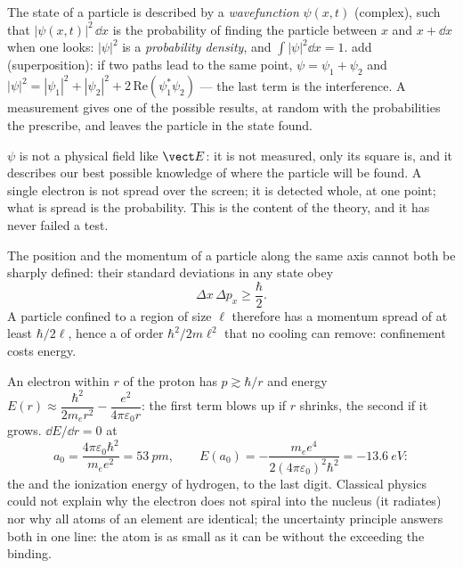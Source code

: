 \begin{definition}[Wavefunction]\label{def:b1:quantum-introduction:wavefunction}
The state of a particle is described by a \emph{wavefunction}
$\psi(x, t)$ (complex), such that $|\psi(x, t)|^2\,\dd x$ is the
probability of finding the particle between $x$ and $x + \dd x$ when one
looks: $|\psi|^2$ is a \emph{probability density}, and $\int|\psi|^2\dd x =
1$.  add (superposition): if two paths lead to the same
point, $\psi = \psi_1 + \psi_2$ and $|\psi|^2 = |\psi_1|^2 + |\psi_2|^2 +
2\,\mathrm{Re}(\psi_1^\ast\psi_2)$ --- the last term is the interference.
A measurement gives one of the possible results, at random with the
probabilities the  prescribe, and leaves the particle in the
state found.
\end{definition}

\begin{remark}\label{rem:b1:quantum-introduction:whatwaves}
$\psi$ is not a physical field like $\vect E$: it is not measured, only
its square is, and it describes our best possible knowledge of where
the particle will be found. A single electron is not spread over the
screen; it is detected whole, at one point; what is spread is the
probability. This is the content of the theory, and it has never failed
a test.
\end{remark}

\begin{theorem}\label{thm:b1:quantum-introduction:heisenberg}
The position and the momentum of a particle along the same axis cannot
both be sharply defined: their standard deviations in any state obey
\[
\Delta x\,\Delta p_x \geq \frac{\hbar}{2} .
\]
A particle confined to a region of size $\ell$ therefore has a momentum
spread of at least $\hbar/2\ell$, hence a  of order
$\hbar^2/2m\ell^2$ that no cooling can remove: confinement costs energy.
\end{theorem}
\admitted

\begin{example}\label{ex:b1:quantum-introduction:hsize}
An electron within $r$ of the proton has $p \gtrsim \hbar/r$ and energy
$E(r) \approx \dfrac{\hbar^2}{2m_er^2} - \dfrac{e^2}{4\pi\varepsilon_0r}$: the first
term blows up if $r$ shrinks, the second if it grows. $\dd E/\dd r = 0$ at
\[
a_0 = \frac{4\pi\varepsilon_0\hbar^2}{m_ee^2} = \qty{53}{pm} , \qquad
E(a_0) = -\frac{m_ee^4}{2(4\pi\varepsilon_0)^2\hbar^2} = \qty{-13.6}{eV} :
\]
the \emph{} and the ionization energy of hydrogen, to the
last digit. Classical physics could not explain why the electron does
not spiral into the nucleus (it radiates) nor why all atoms of an
element are identical; the uncertainty principle answers both in one
line: the atom is as small as it can be without the 
exceeding the binding.
\end{example}

